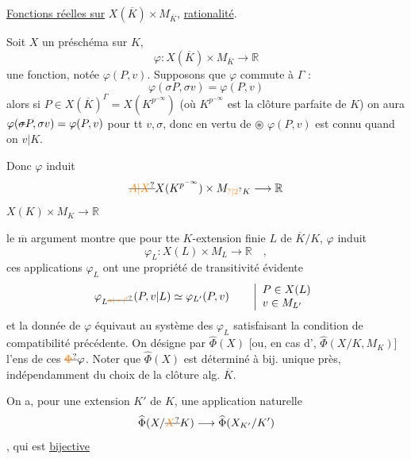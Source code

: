\uline{Fonctions réelles sur} $X(\overline K)\times M_{\overline K}$,  \uline{rationalité}.

Soit $X$ un préschéma sur $K$, \deleted{[\unsure{quelconque}} 
\[
\varphi:X(\overline K)\times M_{\overline K}\longrightarrow\mathbb R
\]
une fonction, notée $\varphi(P,v)$. Supposons que $\varphi$ commute à $\Gamma$ :
\[
\varphi(\sigma P,\sigma v)=\varphi(P,v)
\]
alors  si \deleted{\unsure{$\sigma$}} $P\in X(\overline K)^\Gamma=X(K^{p^{-\infty}})$ (où $K^{p^{-\infty}}$ est la clôture parfaite de $K$)  on aura $\varphi(\deleted{\sigma}P,\sigma v)=\varphi(P,v)$ pour tt $v,\sigma$, donc en vertu de $\circledast$ $\varphi(P,v)$ est connu quand on  \deleted{\unsure{$\sigma$}} $v|K$.

Donc $\varphi$ induit
\[
\deleted{\unsure{A|X}}X(K^{p^{-\infty}})\times M_{\unsure{?|2}K}\longrightarrow\mathbb R
\]
  $X(K)\times M_K\longrightarrow\mathbb R$

le $\overline{\mathrm m}$ argument montre que pour tte $K$-extension finie $L$ de $\overline K/K$, $\varphi$ induit
\[
\varphi_L:X(L)\times M_L\longrightarrow\mathbb R\quad,
\]
ces applications $\varphi_L$ ont une propriété de transitivité évidente
\[
\varphi_{L^{\deleted{\unsure{\alpha|*|'}}}}(P,v|L)\simeq\varphi_{L'}(P,v)
\qquad\left|\begin{array}{l}P\in X(L)\\ v\in M_{L'}\end{array}\right.
\]
et la donnée de $\varphi$ équivaut au système des $\varphi_L$ satisfaisant la condition de compatibilité précédente. On  désigne par $\widehat{\Phi}(X)$ [ou, en cas d', $\widehat{\Phi}(X/K,M_K)$] l'ens de ces $\deleted{\unsure{\Phi}}\varphi$. Noter que $\widehat{\Phi}(X)$ est déterminé à bij. unique près, indépendamment du choix de la clôture alg. $\overline K$.

On a, pour une extension  $K'$ de $K$, une application naturelle
\[
\widehat{\Phi}(X/\deleted{\unsure{X}}K)\longrightarrow\widehat{\Phi}(X_{K'}/K')
\]
, qui est \uline{bijective}
